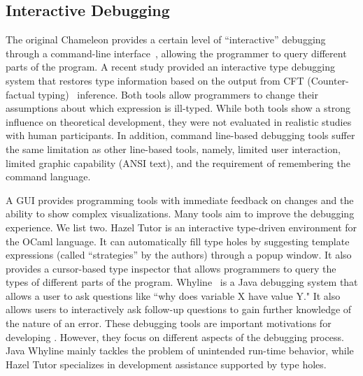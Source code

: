 \subsection{Interactive Debugging}
The original Chameleon provides a certain level of ``interactive'' debugging through a command-line interface~\cite{stuckey_interactive_2003}, allowing the programmer to query different parts of the program. A recent study \cite{tsushima_type_2021} provided an interactive type debugging system that restores type information based on the output from CFT (Counter-factual typing)~\cite{chen_counter-factual_2014, chen_efficient_2020, chen_improving_2022} inference. Both tools allow programmers to change their assumptions about which expression is ill-typed. While both tools show a strong influence on theoretical development, they were not evaluated in realistic studies with human participants. In addition, command line-based debugging tools suffer the same limitation as other line-based tools, namely, limited user interaction, limited graphic capability (ANSI text), and the requirement of remembering the command language. 

A GUI provides programming tools with immediate feedback on changes and the ability to show complex visualizations. Many tools aim to improve the debugging experience. We list two. Hazel Tutor \cite{potter_hazel_2020} is an interactive type-driven environment for the OCaml language. It can automatically fill type holes by suggesting template expressions (called ``strategies'' by the authors) through a popup window. It also provides a cursor-based type inspector that allows programmers to query the types of different parts of the program. Whyline~\cite{ko_finding_2009} is a Java debugging system that allows a user to ask questions like ``why does variable X have value Y." It also allows users to interactively ask follow-up questions to gain further knowledge of the nature of an error. These debugging tools are important motivations for developing \chameleon{}. However, they focus on different aspects of the debugging process. Java Whyline mainly tackles the problem of unintended run-time behavior, while Hazel Tutor specializes in development assistance supported by type holes.





